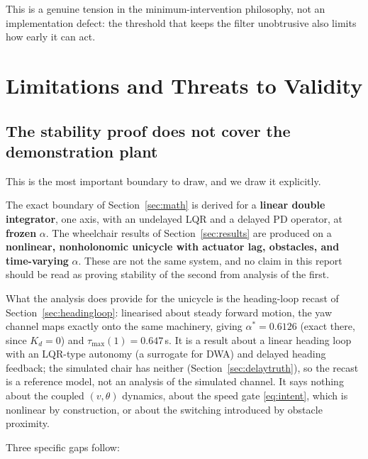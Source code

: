 \documentclass[11pt,a4paper]{article}
\newcommand{\astar}{\alpha^{*}}
\theoremstyle{plain}
\theoremstyle{definition}
\begin{document}
This is a genuine tension in the minimum-intervention philosophy, not an
implementation defect: the threshold that keeps the filter unobtrusive
also limits how early it can act.

\section{Limitations and Threats to Validity}
\label{sec:limits}

\subsection{The stability proof does not cover the demonstration plant}
\label{sec:proofscope}

This is the most important boundary to draw, and we draw it explicitly.

The exact boundary of Section~\ref{sec:math} is derived for a
\textbf{linear double integrator}, one axis, with an undelayed LQR and a
delayed PD operator, at \textbf{frozen} $\alpha$. The wheelchair results
of Section~\ref{sec:results} are produced on a \textbf{nonlinear,
nonholonomic unicycle with actuator lag, obstacles, and time-varying}
$\alpha$. These are not the same system, and no claim in this report
should be read as proving stability of the second from analysis of the
first.

What the analysis does provide for the unicycle is the heading-loop
recast of Section~\ref{sec:headingloop}: linearised about steady forward
motion, the yaw channel maps exactly onto the same machinery, giving
$\astar = 0.6126$ (exact there, since $K_d = 0$) and
$\tau_{\max}(1) = 0.647$\,s. It is a result about a linear heading
loop with an LQR-type autonomy (a surrogate for DWA) and delayed heading
feedback; the simulated chair has neither (Section~\ref{sec:delaytruth}),
so the recast is a reference model, not an analysis of the simulated
channel. It says nothing about the coupled $(v,\theta)$
dynamics, about the speed gate \eqref{eq:intent}, which is nonlinear by
construction, or about the switching introduced by obstacle proximity.

Three specific gaps follow:
\end{document}
